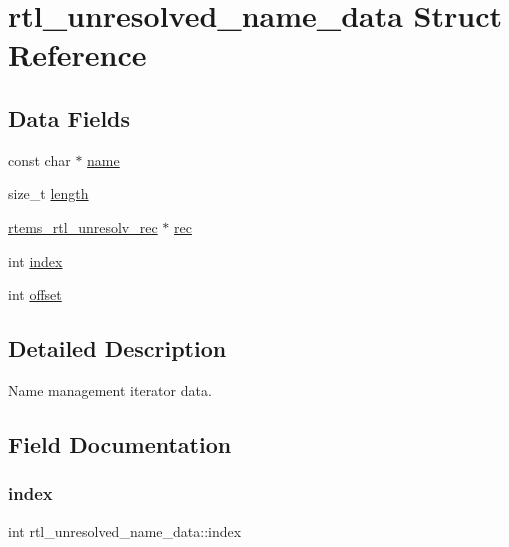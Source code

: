 \hypertarget{structrtl__unresolved__name__data}{}\section{rtl\+\_\+unresolved\+\_\+name\+\_\+data Struct Reference}
\label{structrtl__unresolved__name__data}
\subsection*{Data Fields}
\begin{DoxyCompactItemize}
\item 
const char $\ast$ \mbox{\hyperlink{structrtl__unresolved__name__data_aee463e55e1ac39fe468d6c285a29ed08}{name}}
\item 
size\+\_\+t \mbox{\hyperlink{structrtl__unresolved__name__data_a9268dd02386e0a939df48e7e1c76a15c}{length}}
\item 
\mbox{\hyperlink{structrtems__rtl__unresolv__rec}{rtems\+\_\+rtl\+\_\+unresolv\+\_\+rec}} $\ast$ \mbox{\hyperlink{structrtl__unresolved__name__data_a5d26c0e62b93b105cf6fe26b39d4ce4a}{rec}}
\item 
int \mbox{\hyperlink{structrtl__unresolved__name__data_abeffc912afa030a5e745ce192a745e47}{index}}
\item 
int \mbox{\hyperlink{structrtl__unresolved__name__data_a573f1def9ce28fb9eb7b86b3cfdc0b49}{offset}}
\end{DoxyCompactItemize}


\subsection{Detailed Description}
Name management iterator data. 

\subsection{Field Documentation}
\mbox{\label{structrtl__unresolved__name__data_abeffc912afa030a5e745ce192a745e47}} 
\subsubsection{\texorpdfstring{index}{index}}
{\footnotesize\ttfamily int rtl\+\_\+unresolved\+\_\+name\+\_\+data\+::index}

